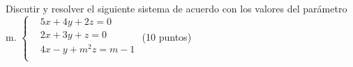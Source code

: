 \documentclass[addpoints,spanish, 12pt,a4paper]{exam}
\begin{document}
\begin{questions}
\question Discutir y resolver el siguiente sistema de acuerdo con los valores del parámetro m.
	$\left\{ \begin{matrix}
  & 5x+4y+2z=0 \\ 
 & 2x+3y+z=0 \\ 
 & 4x-y+{{m}^{2}}z=m-1 \\ 
\end{matrix} \right.$	(10 puntos)


\addpoints



\end{questions}
\end{document}
